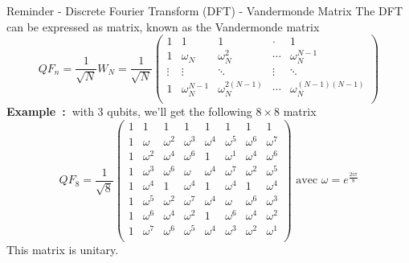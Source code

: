 \begin{frame}{Reminder - Discrete Fourier Transform (DFT) - Vandermonde Matrix}
The DFT can be expressed as matrix, known as the Vandermonde matrix
    \begin{equation*}
    QF_n = \frac{1}{\sqrt{N}} W_N = \frac{1}{\sqrt{N}} 
    \begin{pmatrix}
        1       & 1                 & 1                  & \cdot  & 1                        \\
        1       & \omega_{N}       & \omega_{N}^2        & \cdots & \omega_{N}^{N-1}         \\
        \vdots  & \vdots           & \ddots              & \vdots & \ddots                   \\
        1       & \omega_{N}^{N-1} & \omega_{N}^{2(N-1)} & \cdots & \omega_{N}^{(N-1)(N-1)}  \\
    \end{pmatrix}
\end{equation*}
\textbf{Example~:~}with 3 qubits, we'll get the following $8 \times 8$ matrix 
\begin{equation*}
    QF_8 = \frac{1}{\sqrt{8}}\begin{pmatrix}
        1 & 1        & 1        & 1        &  1       & 1        & 1        & 1        \\
        1 & \omega   & \omega^2 & \omega^3 & \omega^4 & \omega^5 & \omega^6 & \omega^7 \\
        1 & \omega^2 & \omega^4 & \omega^6 & 1        & \omega^1 & \omega^4 & \omega^6 \\
        1 & \omega^3 & \omega^6 & \omega   & \omega^4 & \omega^7 & \omega^2 & \omega^5 \\
        1 & \omega^4 & 1        & \omega^4 & 1        & \omega^4 & 1        & \omega^4 \\
        1 & \omega^5 & \omega^2 & \omega^7 & \omega^4 & \omega   & \omega^6 & \omega^3 \\
        1 & \omega^6 & \omega^4 & \omega^2 & 1        & \omega^6 & \omega^4 & \omega^2 \\
        1 & \omega^7 & \omega^6 & \omega^5 & \omega^4 & \omega^3 & \omega^2 & \omega^1 \\
    \end{pmatrix} \textrm{ avec } \omega = e^{\frac{2i\pi}{8}}
\end{equation*}
This matrix is unitary. 
\end{frame}

